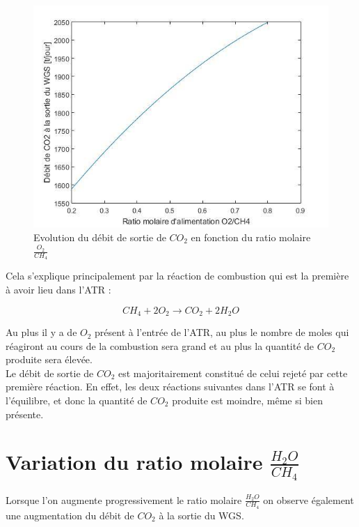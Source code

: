 \documentclass[12pt]{report}
\begin{document}
\begin{figure}[H]
\begin{center}
\includegraphics[scale=0.6]{debit_CO2_ratio_O2}
\caption{Evolution du débit de sortie de $CO_2$ en fonction du ratio molaire $\frac{O_2}{CH_4}$}
\end{center}
\end{figure}

Cela s'explique principalement par la réaction de combustion qui est la première à avoir lieu dans l'ATR :

\begin{equation}
 CH_4 + 2O_2 \rightarrow CO_2 + 2H_2O
\end{equation}

Au plus il y a de $O_2$ présent à l'entrée de l'ATR, au plus le nombre de moles qui réagiront au cours de la combustion sera grand et au plus la quantité de $CO_2$ produite sera élevée.\\
Le débit de sortie de $CO_2$ est majoritairement constitué de celui rejeté par cette première réaction. En effet, les deux réactions suivantes dans l'ATR se font à l'équilibre, et donc la quantité de $CO_2$ produite est moindre, même si bien présente.\\ 


\section{Variation du ratio molaire $\frac{H_2O}{CH_4}$}

Lorsque l'on augmente progressivement le ratio molaire $\frac{H_2O}{CH_4}$ on observe également une augmentation du débit de $CO_2$ à la sortie du WGS.\\
\end{document}

